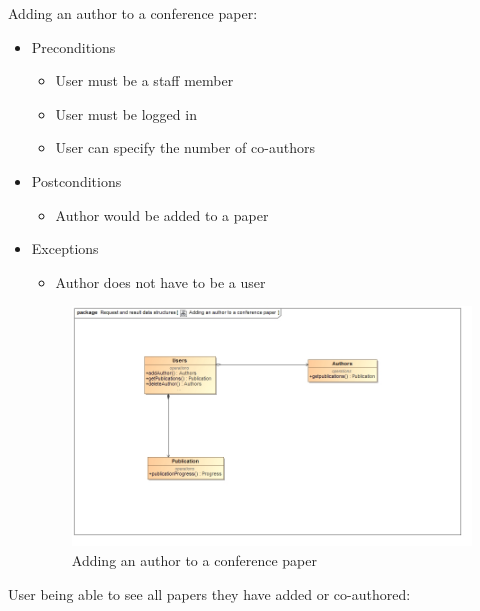 \documentclass[a4paper,12pt]{article}
\begin{document}
Adding an author to a conference paper:
\begin{itemize}
    \item Preconditions
    \begin{itemize}
        \item User must be a staff member
        \item User must be logged in
        \item User can specify the number of co-authors
    \end{itemize}
    \item Postconditions
    \begin{itemize}
        \item Author would be added to a paper
    \end{itemize}
    \item Exceptions
    \begin{itemize}
        \item Author does not have to be a user
    \end{itemize}
    
    \begin{figure}[H]
    \centering
    \caption{Adding an author to a conference paper}
    \includegraphics[width=1\textwidth]{use-case/adding-an-author-to-a-conference-paper.png}
    \end{figure}
\end{itemize}
User being able to see all papers they have added or co-authored:
\end{document}
